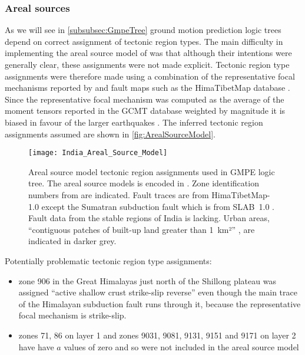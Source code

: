 \documentclass{article}
\begin{document}
\cite{thingbaijam2011seismogenic}

\subsubsection{Areal sources}
\label{sec:Areal}

As we will see in \autoref{subsubsec:GmpeTree} ground motion prediction logic trees depend on correct assignment of tectonic region types. The main difficulty in implementing the areal source model of  \cite{nath2012probabilistic} was that although their intentions were generally clear, these assignments were not made explicit. Tectonic region type assignments were therefore made using a combination of the representative focal mechanisms reported by \cite{nath2012probabilistic} and fault maps such as the HimaTibetMap database \citep{styron2010database}. Since the representative focal mechanism was computed as the average of the moment tensors reported in the GCMT database weighted by magnitude it is biased in favour of the larger earthquakes \citep{thingbaijam2011seismogenic}. The inferred tectonic region assignments assumed are shown in \autoref{fig:ArealSourceModel}.

\begin{figure}[!htb]
\begin{adjustbox}{center}
\texttt{[image: India\_Areal\_Source\_Model]}
\end{adjustbox}
\caption[Areal source model]{Areal source model tectonic region assignments used in GMPE logic tree. The areal source models is encoded in \texttt{}. Zone identification numbers from \cite{nath2012probabilistic} are indicated. Fault traces are from HimaTibetMap-1.0 \citep{styron2010database} except the Sumatran subduction fault which is from SLAB~1.0 \citep{hayes2012slab1}. Fault data from the stable regions of India is lacking. Urban areas, ``contiguous patches of built-up land greater than 1~km²'' \citep{schneider2009new}, are indicated in darker grey.}
\label{fig:ArealSourceModel}
\end{figure}

Potentially problematic tectonic region type assignments:
\begin{itemize}
\item zone 906 in the Great Himalayas just north of the Shillong plateau was assigned ``active shallow crust strike-slip reverse'' even though the main trace of the Himalayan subduction fault runs through it, because the representative focal mechanism is strike-slip. 
\item zones 71, 86 on layer 1 and zones 9031, 9081, 9131, 9151 and 9171 on layer 2 have have $a$ values of zero and so were not included in the areal source model
\end{itemize}
\end{document}
